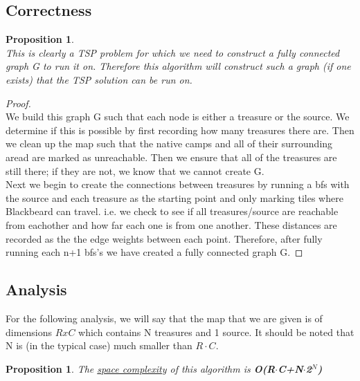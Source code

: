 \documentclass[12pt]{article}
\newtheorem{proposition}[theorem]{Proposition}
\begin{document}

\subsection{Correctness}
\begin{proposition}
~ \\ \indent This is clearly a TSP problem for which we need to construct a fully connected graph G
to run it on. Therefore this algorithm will construct such a graph (if one exists) that the TSP
solution can be run on.
\end{proposition}

\begin{proof}
~ \\ \indent We build this graph G such that each node is either a treasure or the source. We determine
if this is possible by first recording how many treasures there are. Then we clean up the map such
that the native camps and all of their surrounding aread are marked as unreachable. Then we ensure
that all of the treasures are still there; if they are not, we know that we cannot create G. \\
\indent Next we begin to create the connections between treasures by running a bfs with the source
and each treasure as the starting point and only marking tiles where Blackbeard can travel. i.e. we
check to see if all treasures/source are reachable from eachother and how far each one is from one
another. These distances are recorded as the the edge weights between each point. Therefore, after
fully running each n+1 bfs's we have created a fully connected graph G.
\end{proof}


\subsection{Analysis}
For the following analysis, we will say that the map that we are given is of dimensions
$RxC$ which contains N treasures and 1 source. It should be noted that N is (in the typical case)
much smaller than $R\cdot C$.


\begin{proposition}
\label{numq}
The \underline{space complexity} of this algorithm is \textbf{O(R$\cdot$C+N$\cdot$2$^N$)}
\end{proposition}
\end{document}
